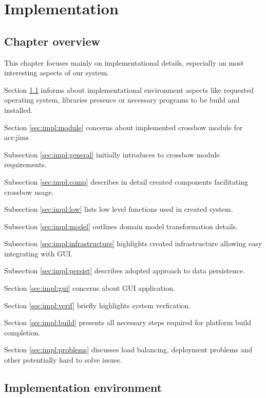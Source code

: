 \documentclass[11pt]{book}
\begin{document}
  \chapter{Implementation}
    
    \section*{Chapter overview}
	
      This chapter focuses mainly on implementational details, especially on most interesting aspects of our system.
		
      Section \ref{sec:impl:env} informs about implementational environment aspects like requested operating system,
      libraries presence or necessary programs to be build and installed. 
	  
	  Section \ref{sec:impl:module} concerns about implemented crossbow module for \gls{acr:jims}
	  
		\quad Subsection \ref{sec:impl:general} initially introduces to crossbow module requirements.

		\quad Subsection \ref{sec:impl:comp} describes in detail created components facilitating crossbow usage.
		
		\quad Subsection \ref{sec:impl:low} lists low level functions used in created system.

		\quad Subsection \ref{sec:impl:model} outlines domain model transformation details.
		
		\quad Subsection \ref{sec:impl:infrastructure} highlights created infrastructure allowing easy integrating with GUI.
		
		\quad Subsection \ref{sec:impl:persist} describes adopted approach to data persistence.
		
	  
	  Section \ref{sec:impl:gui} concerns about GUI application.
	  
	  Section \ref{sec:impl:verif} briefly highlights system verfication.
	
	  Section \ref{sec:impl:build} presents all necessary steps required for platform build completion.
	  
          Section \ref{sec:impl:problems} discusses load balancing, deployment problems and other potentially hard to solve issues.
		


    \section{Implementation environment}
    \label{sec:impl:env}
\end{document}
